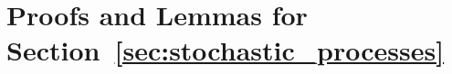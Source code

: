 \documentclass[10pt,a4paper]{paper}
\theoremstyle{definition}
\newtheorem{lemma}[theorem]{Lemma}
\newcommand{\reals}{\mathbb{R}}
\newcommand{\realsnonneg}{\reals_{\geq 0}}
\newcommand{\processes}{\mathbb{P}}
\newcommand{\wmprocesses}{\processes^{\mathrm{WM}}}
\newcommand{\rateset}{\mathcal{Q}}
\newcommand{\norm}[1]{\left\lVert #1 \right\rVert}
\newcommand{\coloneqq}{:\!=}
\begin{document}

\section{Proofs and Lemmas for Section~\ref{sec:stochastic_processes}}\label{app:stoch_proc}
\end{document}
